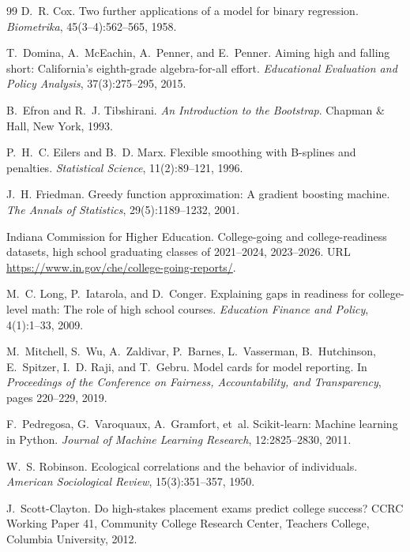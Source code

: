 \documentclass[11pt]{article}
\begin{document}
\begin{thebibliography}{99}
 D.~R. Cox. Two further applications of a model for binary regression. \emph{Biometrika}, 45(3--4):562--565, 1958.

 T.~Domina, A.~McEachin, A.~Penner, and E.~Penner. Aiming high and falling short: California's eighth-grade algebra-for-all effort. \emph{Educational Evaluation and Policy Analysis}, 37(3):275--295, 2015.

 B.~Efron and R.~J. Tibshirani. \emph{An Introduction to the Bootstrap}. Chapman \& Hall, New York, 1993.

 P.~H.~C. Eilers and B.~D. Marx. Flexible smoothing with B-splines and penalties. \emph{Statistical Science}, 11(2):89--121, 1996.

 J.~H. Friedman. Greedy function approximation: A gradient boosting machine. \emph{The Annals of Statistics}, 29(5):1189--1232, 2001.

 Indiana Commission for Higher Education. College-going and college-readiness datasets, high school graduating classes of 2021--2024, 2023--2026. URL \url{https://www.in.gov/che/college-going-reports/}.

 M.~C. Long, P.~Iatarola, and D.~Conger. Explaining gaps in readiness for college-level math: The role of high school courses. \emph{Education Finance and Policy}, 4(1):1--33, 2009.

 M.~Mitchell, S.~Wu, A.~Zaldivar, P.~Barnes, L.~Vasserman, B.~Hutchinson, E.~Spitzer, I.~D. Raji, and T.~Gebru. Model cards for model reporting. In \emph{Proceedings of the Conference on Fairness, Accountability, and Transparency}, pages 220--229, 2019.

 F.~Pedregosa, G.~Varoquaux, A.~Gramfort, et~al. Scikit-learn: Machine learning in Python. \emph{Journal of Machine Learning Research}, 12:2825--2830, 2011.

 W.~S. Robinson. Ecological correlations and the behavior of individuals. \emph{American Sociological Review}, 15(3):351--357, 1950.

 J.~Scott-Clayton. Do high-stakes placement exams predict college success? CCRC Working Paper 41, Community College Research Center, Teachers College, Columbia University, 2012.


\end{thebibliography}
\end{document}
